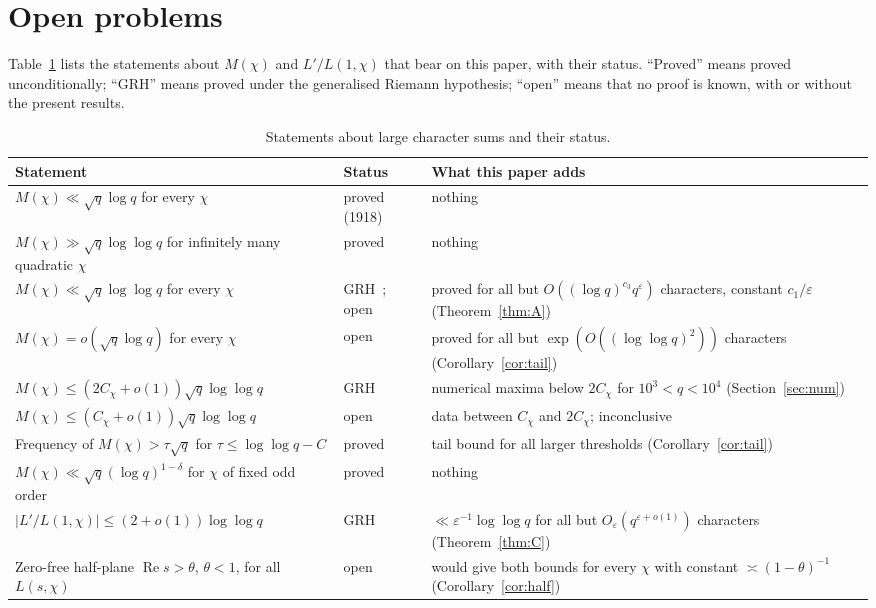 \documentclass[11pt,a4paper,reqno]{amsart}
\theoremstyle{remark}
\numberwithin{equation}{section}
\renewcommand{\Re}{\operatorname{Re}}
\newcommand{\eps}{\varepsilon}
\begin{document}
\section{Open problems}\label{sec:open}

Table~\ref{tab:verdicts} lists the statements about $M(\chi)$ and $L'/L(1,\chi)$ that bear on this paper, with their status. ``Proved'' means proved unconditionally; ``GRH'' means proved under the generalised Riemann hypothesis; ``open'' means that no proof is known, with or without the present results.

\begin{table}[ht]
\centering
\small
\renewcommand{\arraystretch}{1.25}
\begin{tabular}{@{}>{\raggedright\arraybackslash}p{}>{\raggedright\arraybackslash}p{}>{\raggedright\arraybackslash}p{}@{}}
\toprule
Statement & Status & What this paper adds\\
\midrule
$M(\chi)\ll\sqrt q\log q$ for every $\chi$ & proved (1918) & nothing\\
$M(\chi)\gg\sqrt q\log\log q$ for infinitely many quadratic $\chi$ & proved~\cite{Pal32} & nothing\\
$M(\chi)\ll\sqrt q\log\log q$ for every $\chi$ & GRH~\cite{MV77}; open & proved for all but $O((\log q)^{c_3}q^{\eps})$ characters, constant $c_1/\eps$ (Theorem~\ref{thm:A})\\
$M(\chi)=o(\sqrt q\log q)$ for every $\chi$ & open & proved for all but $\exp(O((\log\log q)^2))$ characters (Corollary~\ref{cor:tail})\\
$M(\chi)\le(2C_\chi+o(1))\sqrt q\log\log q$ & GRH~\cite{GS07} & numerical maxima below $2C_\chi$ for $10^3<q<10^4$ (Section~\ref{sec:num})\\
$M(\chi)\le(C_\chi+o(1))\sqrt q\log\log q$ & open~\cite{GS07} & data between $C_\chi$ and $2C_\chi$; inconclusive\\
Frequency of $M(\chi)>\tau\sqrt q$ for $\tau\le\log\log q-C$ & proved~\cite{BGGK18} & tail bound for all larger thresholds (Corollary~\ref{cor:tail})\\
$M(\chi)\ll\sqrt q(\log q)^{1-\delta}$ for $\chi$ of fixed odd order & proved~\cite{GS07,Gol12,LM22} & nothing\\
$|L'/L(1,\chi)|\le(2+o(1))\log\log q$ & GRH~\cite{IMS09} & $\ll\eps^{-1}\log\log q$ for all but $O_\eps(q^{\eps+o(1)})$ characters (Theorem~\ref{thm:C})\\
Zero-free half-plane $\Re s>\theta$, $\theta<1$, for all $L(s,\chi)$ & open & would give both bounds for every $\chi$ with constant $\asymp(1-\theta)^{-1}$ (Corollary~\ref{cor:half})\\
\bottomrule
\end{tabular}
\caption{Statements about large character sums and their status.}
\label{tab:verdicts}
\end{table}
\end{document}
